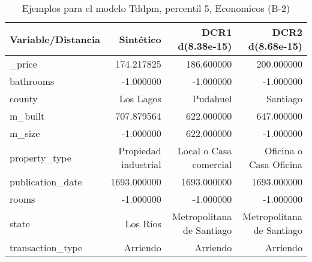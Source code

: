 \begin{table}[H]
\centering
\fontsize{10}{14}\selectfont
\caption{Ejemplos para el modelo Tddpm, percentil 5, Economicos (B-2)}
\label{table-example-economicos-b-2-tddpm_mlp-5p}
\begin{tabular}{|l|r|r|r|}
\hline
\rowcolor[gray]{0.8}
Variable/Distancia & Sintético & DCR1 d(8.38e-15) & DCR2 d(8.68e-15) \\
\hline \_price & \cellcolor[rgb]{0.9, 0.54, 0.52} 174.217825 & 186.600000 & 200.000000 \\
\hline bathrooms & \cellcolor[rgb]{0.9, 0.54, 0.52} -1.000000 & \cellcolor[rgb]{0.9, 0.54, 0.52} -1.000000 & \cellcolor[rgb]{0.9, 0.54, 0.52} -1.000000 \\
\hline county & \cellcolor[rgb]{0.9, 0.54, 0.52} Los Lagos & Pudahuel & Santiago \\
\hline m\_built & \cellcolor[rgb]{0.9, 0.54, 0.52} 707.879564 & 622.000000 & 647.000000 \\
\hline m\_size & \cellcolor[rgb]{0.9, 0.54, 0.52} -1.000000 & 622.000000 & \cellcolor[rgb]{0.9, 0.54, 0.52} -1.000000 \\
\hline property\_type & \cellcolor[rgb]{0.9, 0.54, 0.52} Propiedad industrial & Local o Casa comercial & Oficina o Casa Oficina \\
\hline publication\_date & \cellcolor[rgb]{0.9, 0.54, 0.52} 1693.000000 & \cellcolor[rgb]{0.9, 0.54, 0.52} 1693.000000 & \cellcolor[rgb]{0.9, 0.54, 0.52} 1693.000000 \\
\hline rooms & \cellcolor[rgb]{0.9, 0.54, 0.52} -1.000000 & \cellcolor[rgb]{0.9, 0.54, 0.52} -1.000000 & \cellcolor[rgb]{0.9, 0.54, 0.52} -1.000000 \\
\hline state & \cellcolor[rgb]{0.9, 0.54, 0.52} Los Ríos & Metropolitana de Santiago & Metropolitana de Santiago \\
\hline transaction\_type & \cellcolor[rgb]{0.9, 0.54, 0.52} Arriendo & \cellcolor[rgb]{0.9, 0.54, 0.52} Arriendo & \cellcolor[rgb]{0.9, 0.54, 0.52} Arriendo \\
\hline
\end{tabular}
\end{table}
